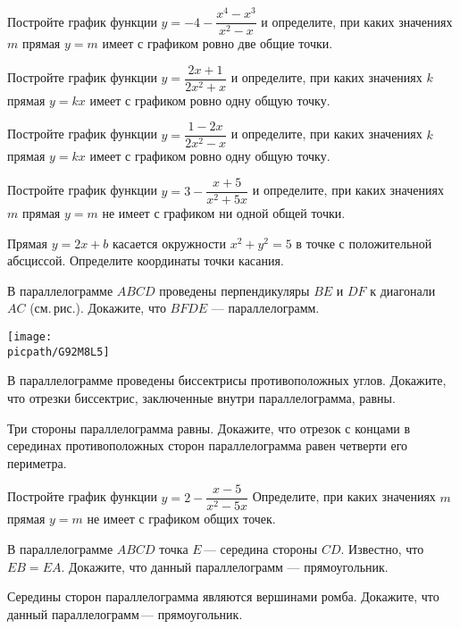 \begin{class}[number=6]
	\begin{listofex}
		\item Постройте график функции \( y=-4-\dfrac{x^4-x^3}{x^2-x} \) и определите, при каких значениях \( m \) прямая \( y=m \) имеет с графиком ровно две общие точки.
		\item Постройте график функции \( y=\dfrac{2x+1}{2x^2+x} \) и определите, при каких значениях \( k \) прямая \( y=kx \) имеет с графиком ровно одну общую точку.
		\item Постройте график функции \( y=\dfrac{1-2x}{2x^2-x} \) и определите, при каких значениях \( k \) прямая \( y=kx \) имеет с графиком ровно одну общую точку.
		\item Постройте график функции \( y=3-\dfrac{x+5}{x^2+5x} \) и определите, при каких значениях \( m \) прямая \( y=m \) не имеет с графиком ни одной общей точки.
		\item Прямая \( y=2x+b \) касается окружности \( x^2+y^2=5 \) в точке с положительной абсциссой. Определите координаты точки касания.
		\item \begin{minipage}[t]{\bodywidth}
			В параллелограмме \( ABCD \) проведены перпендикуляры \( BE \) и \( DF \) к диагонали \( AC \) (см. рис.). Докажите, что \( BFDE \) --- параллелограмм.
		\end{minipage}
		\gapwidth
		\begin{minipage}[t]{\picwidth}
			\texttt{[image: \\picpath/G92M8L5]}
		\end{minipage}
		\item В параллелограмме проведены биссектрисы противоположных углов. Докажите, что отрезки биссектрис, заключенные внутри параллелограмма, равны.
		\item Три стороны параллелограмма равны. Докажите, что отрезок с концами в серединах противоположных сторон параллелограмма равен четверти его периметра.
	\end{listofex}
\end{class}

\begin{homework}[number=3]
	\begin{listofex}
		\item Постройте график функции \( y=2-\dfrac{x-5}{x^2-5x} \) Определите, при каких значениях \( m \) прямая \( y=m \) не имеет с графиком общих точек.
		\item В параллелограмме \( ABCD \) точка \( E \) --- середина стороны \( CD \). Известно, что \( EB=EA \). Докажите, что данный параллелограмм --- прямоугольник.
		\item Середины сторон параллелограмма являются вершинами ромба. Докажите, что данный параллелограмм --- прямоугольник.
	\end{listofex}
\end{homework}

